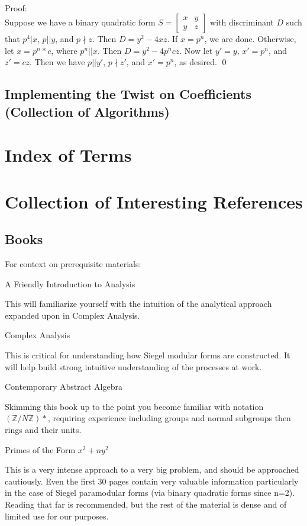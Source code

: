 \documentclass[11pt, oneside]{amsart}
\begin{document}
\\
Proof:
\\
Suppose we have a binary quadratic form $S=
\begin{bmatrix}
x &	y \\
y & z
\end{bmatrix}$ with discriminant $D$ such that $p^4\vert x$, $p\vert \vert y$, and $p\nmid z$. Then $D=y^2-4xz$. If $x=p^n$, we are done. Otherwise, let $x=p^n*c$, where $p^n\vert \vert x$. Then $D=y^2-4p^ncz$. Now let $y'=y$, $x'=p^n$, and $z'=cz$. Then we have $p\vert \vert y'$, $p\nmid z'$, and $x'=p^n$, as desired. \qed
\subsection{Implementing the Twist on Coefficients (Collection of Algorithms)}

\section{Index of Terms}
\section{Collection of Interesting References}
\subsection{Books}
For context on prerequisite materials:
\begin{list}{}{}
\item A Friendly Introduction to Analysis
\begin{list}{}{}
	\item This will familiarize yourself with the intuition of the analytical approach expanded upon in Complex Analysis.
\end{list}
\item Complex Analysis
\begin{list}{}{}
	\item This is critical for understanding how Siegel modular forms are constructed. It will help build strong intuitive understanding of the processes at work.
\end{list}
\item Contemporary Abstract Algebra
\begin{list}{}{}
	\item Skimming this book up to the point you become familiar with notation $(\mathbb{Z}/N\mathbb{Z})*$, requiring experience including groups and normal subgroups then rings and their units.
\end{list}
\item Primes of the Form $x^2+ny^2$
\begin{list}{}{}
	\item This is a very intense approach to a very big problem, and should be approached cautiously. Even the first 30 pages contain very valuable information particularly in the case of Siegel paramodular forms (via binary quadratic forms since n=2). Reading that far is recommended, but the rest of the material is dense and of limited use for our purposes.
\end{list}
\end{list}
\end{document}
